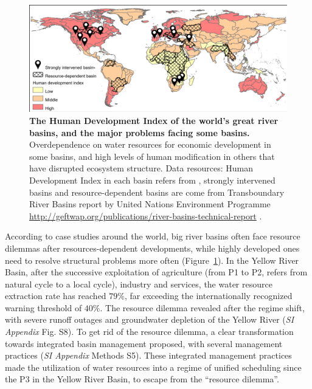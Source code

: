 \documentclass[9pt, twocolumn, twoside, lineno]{pnas-new}
\begin{document}
\begin{figure}%
	\centering
	\includegraphics[width=\linewidth]{../../figures/main/big_rivers.pdf}
	\caption{
		\textbf{The Human Development Index of the world's great river basins, and the major problems facing some basins.}
		Overdependence on water resources for economic development in some basins, and high levels of human modification in others that have disrupted ecosystem structure. Data resources: Human Development Index in each basin refers from \cite{linkeGlobalHydroenvironmentalSubbasin2019}, strongly intervened basins and resource-dependent basins are come from Transboundary River Basins report by United Nations Environment Programme \url{http://geftwap.org/publications/river-basins-technical-report} \cite{unep-dhiTransboundaryRiverBasins2016}.
	}
	\label{fig:traps}
\end{figure}

According to case studies around the world, big river basins often face resource dilemmas after resources-dependent developments, while highly developed ones need to resolve structural problems more often (Figure~\ref{fig:traps}).
In the Yellow River Basin, after the successive exploitation of agriculture (from P1 to P2, refers from natural cycle to a local cycle), industry and services, the water resource extraction rate has reached $79\%$, far exceeding the internationally recognized warning threshold of $40\%$. The resource dilemma revealed after the regime shift, with severe runoff outages and groundwater depletion of the Yellow River (\textit{SI Appendix} Fig. S8).
To get rid of the resource dilemma, a clear transformation towards integrated basin management proposed, with several management practices (\textit{SI Appendix} Methods S5). These integrated management practices made the utilization of water resources into a regime of unified scheduling since the P3 in the Yellow River Basin, to escape from the “resource dilemma”. 
\end{document}
